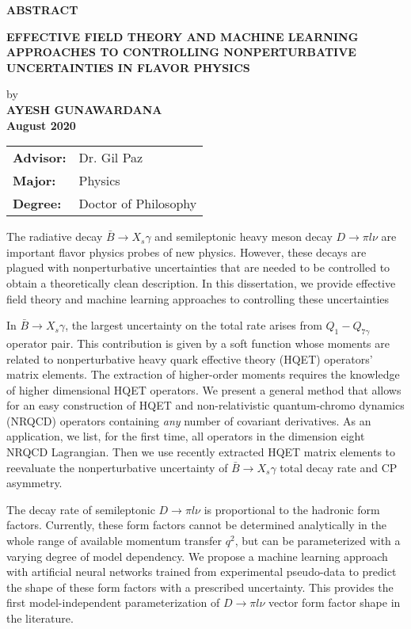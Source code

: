 
\begin{center}
\textbf{ABSTRACT}
	
	
	\singlespacing
\textbf{EFFECTIVE FIELD THEORY AND MACHINE LEARNING APPROACHES TO CONTROLLING NONPERTURBATIVE UNCERTAINTIES IN FLAVOR PHYSICS}\\
	\doublespacing
	
	by\\
	
	\textbf{AYESH GUNAWARDANA}\\
	\textbf{August 2020} \\
\end{center}
\begin{tabular}{ll}	
\textbf{Advisor:} &Dr. Gil Paz \\
\textbf{Major:}   &Physics\\
\textbf{Degree:}  &Doctor of Philosophy\\
\end{tabular}
\bigskip
\par
The radiative decay $\bar{B}\to X_s\gamma$ and semileptonic heavy meson decay $D\to \pi l \nu$ are important flavor physics probes of new physics. However, these decays are
plagued with nonperturbative uncertainties that are needed to be controlled to
obtain a theoretically clean description. In this dissertation, we provide effective
field theory and machine learning approaches to controlling these uncertainties\par
In $\bar B\to X_s\gamma$, the largest uncertainty on the total rate arises from $Q_1-Q_{7\gamma}$ operator pair.  This contribution is given by a soft function whose moments are
related to nonperturbative heavy quark effective theory (HQET) operators’ matrix elements. The extraction of higher-order moments requires the knowledge of
higher dimensional HQET operators. We present a general method that allows
for an easy construction of HQET and non-relativistic quantum-chromo dynamics
(NRQCD) operators containing \textit{any} number of covariant derivatives. As an application, we list, for the first time, all operators in the dimension eight NRQCD
Lagrangian. Then we use recently extracted HQET matrix elements to reevaluate
the nonperturbative uncertainty of $\bar B\to X_s\gamma$  total decay rate and CP asymmetry.\par
The decay rate of semileptonic $D\to \pi l \nu$  is proportional to the hadronic form factors. Currently, these form factors cannot be determined analytically in the
whole range of available momentum transfer $q^2$, but can be parameterized with
a varying degree of model dependency. We propose a machine learning approach
with artificial neural networks trained from experimental pseudo-data to predict
the shape of these form factors with a prescribed uncertainty. This provides the
first model-independent parameterization of $D\to \pi l \nu$ vector form factor shape in the literature. 

 